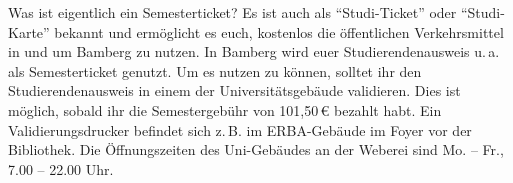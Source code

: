 Was ist eigentlich ein Semesterticket? Es ist auch als \enquote{Studi-Ticket} oder \enquote{Studi-Karte} bekannt und ermöglicht es euch, kostenlos die öffentlichen Verkehrsmittel in und um Bamberg zu nutzen.  In Bamberg wird euer Studierenden\-ausweis u.\,a. als Semesterticket genutzt. Um es nutzen zu können, solltet ihr den Studierenden\-ausweis in einem der Universitätsgebäude validieren. Dies ist möglich, sobald ihr die Semestergebühr von 101,50\,\euro{} bezahlt habt. Ein Validierungsdrucker befindet sich z.\,B. im ERBA-Gebäude im Foyer vor der Bibliothek. Die Öffnungszeiten des Uni-Gebäudes an der Weberei sind Mo. -- Fr., 7.00 -- 22.00 Uhr. 
